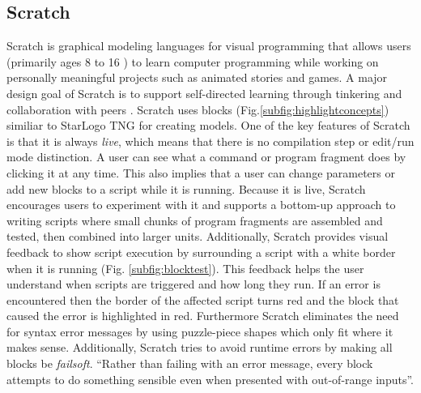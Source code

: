 \documentclass[runningheads,a4paper]{llncs}
\begin{document}

   \subsection{Scratch}
  Scratch is graphical modeling languages for visual programming that allows users (primarily ages 8 to 16 \cite{maloney2010scratch}) to learn
  computer programming while working on personally meaningful projects such as animated stories and games. 
  A major design goal of Scratch is to support self-directed learning through tinkering and collaboration with peers \cite{maloney2010scratch}. 
  Scratch uses blocks (Fig.\ref{subfig:highlightconcepts}) similiar to StarLogo TNG for creating models. One of the key features of Scratch is that it is always \emph{live},
  which means that there is no compilation step or edit/run mode distinction. A user can see what a command or program fragment does by clicking 
  it at any time. This also implies that a user can change parameters or add new blocks to a script while it is running.
  Because it is live, Scratch encourages users to experiment with it and supports
  a bottom-up approach to writing scripts where small chunks of program fragments are assembled and tested, then combined into larger units.
  Additionally, Scratch provides visual feedback to show script execution by surrounding a script with a white border when it is 
  running (Fig. \ref{subfig:blocktest}). This feedback
  helps the user understand when scripts are triggered and how long they run. If an error is encountered then the border of the 
  affected script turns red and the block that caused the error is highlighted in red. 
  Furthermore Scratch eliminates the need for syntax error messages by using 
  puzzle-piece shapes which only fit where it makes sense. Additionally, Scratch tries to avoid runtime errors by making all blocks be
  \textit{failsoft}. ``Rather than failing with an error message, every block attempts to do something sensible even when presented with out-of-range inputs''\cite{maloney2010scratch}.
\end{document}
